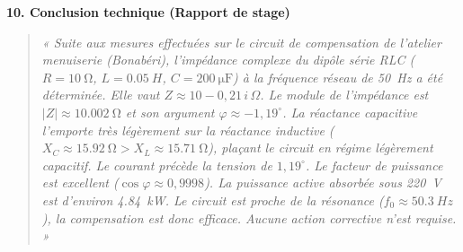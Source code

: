 \documentclass[11pt]{article}
\begin{document}
\begin{exoresolu}
\textbf{10. Conclusion technique (Rapport de stage)}
\begin{quote}
\textit{« Suite aux mesures effectuées sur le circuit de compensation de l'atelier menuiserie (Bonabéri), l'impédance complexe du dipôle série RLC ($R=\SI{10}{\ohm}$, $L=\SI{0,05}{H}$, $C=\SI{200}{\micro\farad}$) à la fréquence réseau de \SI{50}{Hz} a été déterminée. Elle vaut $Z \approx 10 - 0,21\,i\,\Omega$. Le module de l'impédance est $|Z| \approx \SI{10,002}{\ohm}$ et son argument $\varphi \approx -1,19^\circ$. La réactance capacitive l'emporte très légèrement sur la réactance inductive ($X_C \approx \SI{15,92}{\ohm} > X_L \approx \SI{15,71}{\ohm}$), plaçant le circuit en régime légèrement capacitif. Le courant précède la tension de $1,19^\circ$. Le facteur de puissance est excellent ($\cos\varphi \approx 0,9998$). La puissance active absorbée sous \SI{220}{V} est d'environ \SI{4,84}{kW}. Le circuit est proche de la résonance ($f_0 \approx \SI{50,3}{Hz}$), la compensation est donc efficace. Aucune action corrective n'est requise. »}
\end{quote}

\tcblower


\end{exoresolu}
\end{document}
